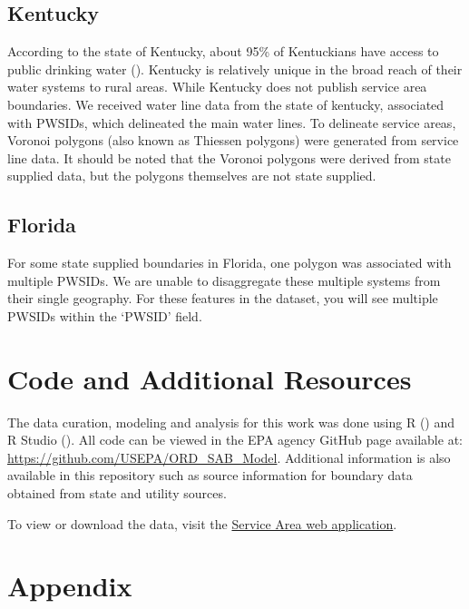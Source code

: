 \documentclass[12pt]{article}
\begin{document}
\subsection{Kentucky}\label{kentucky}

According to the state of Kentucky, about 95\% of Kentuckians have
access to public drinking water ().
Kentucky is relatively unique in the broad reach of their water systems
to rural areas. While Kentucky does not publish service area boundaries.
We received water line data from the state of kentucky, associated with
PWSIDs, which delineated the main water lines. To delineate service
areas, Voronoi polygons (also known as Thiessen polygons) were generated
from service line data. It should be noted that the Voronoi polygons
were derived from state supplied data, but the polygons themselves are
not state supplied.

\subsection{Florida}\label{florida}

For some state supplied boundaries in Florida, one polygon was
associated with multiple PWSIDs. We are unable to disaggregate these
multiple systems from their single geography. For these features in the
dataset, you will see multiple PWSIDs within the `PWSID' field.

\section{Code and Additional
Resources}\label{code-and-additional-resources}

The data curation, modeling and analysis for this work was done using R
() and R Studio
(). All code can be viewed in the
EPA agency GitHub page available at:
\url{https://github.com/USEPA/ORD_SAB_Model}. Additional information is
also available in this repository such as source information for
boundary data obtained from state and utility sources.

To view or download the data, visit the
\href{https://epa.maps.arcgis.com/apps/webappviewer/index.html?id=5a9963ca7a594fbd9b0df40050ed704e}{Service
Area web application}.

\section{Appendix}\label{appendix}
\end{document}
